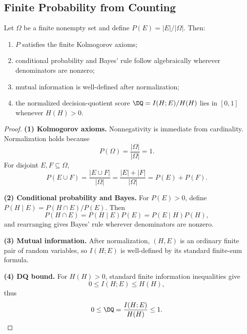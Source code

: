 \subsection{Finite Probability from Counting}

\begin{theorem}\label{thm:bayes-from-counting}
Let $\Omega$ be a finite nonempty set and define $P(E)=|E|/|\Omega|$. Then:
\begin{enumerate}
\item $P$ satisfies the finite Kolmogorov axioms;
\item conditional probability and Bayes' rule follow algebraically wherever denominators are nonzero;
\item mutual information is well-defined after normalization;
\item the normalized decision-quotient score $\DQ=I(H;E)/H(H)$ lies in $[0,1]$ whenever $H(H)>0$.
\end{enumerate}
\end{theorem}

\begin{proof}
\textbf{(1) Kolmogorov axioms.}
Nonnegativity is immediate from cardinality. Normalization holds because
\[
P(\Omega)=\frac{|\Omega|}{|\Omega|}=1.
\]
For disjoint $E,F\subseteq \Omega$,
\[
P(E\cup F)=\frac{|E\cup F|}{|\Omega|}=\frac{|E|+|F|}{|\Omega|}=P(E)+P(F).
\]

\textbf{(2) Conditional probability and Bayes.}
For $P(E)>0$, define $P(H\mid E)=P(H\cap E)/P(E)$. Then
\[
P(H\cap E)=P(H\mid E)P(E)=P(E\mid H)P(H),
\]
and rearranging gives Bayes' rule wherever denominators are nonzero.

\textbf{(3) Mutual information.}
After normalization, $(H,E)$ is an ordinary finite pair of random variables, so $I(H;E)$ is well-defined by its standard finite-sum formula.

\textbf{(4) DQ bound.}
For $H(H)>0$, standard finite information inequalities give
\[
0 \le I(H;E) \le H(H),
\]
thus
\[
0 \le \DQ = \frac{I(H;E)}{H(H)} \le 1.
\]
\end{proof}
